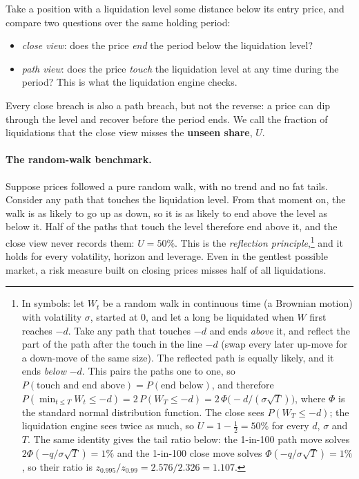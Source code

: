 Take a position with a liquidation level some distance below its entry price, and compare two
questions over the same holding period:
\begin{itemize}\itemsep0pt
\item \emph{close view}: does the price \emph{end} the period below the liquidation level?
\item \emph{path view}: does the price \emph{touch} the liquidation level at any time during the
period? This is what the liquidation engine checks.
\end{itemize}
Every close breach is also a path breach, but not the reverse: a price can dip through the level and
recover before the period ends. We call the fraction of liquidations that the close view misses the
\textbf{unseen share}, $U$.

\paragraph{The random-walk benchmark.} Suppose prices followed a pure random walk, with no trend and
no fat tails. Consider any path that touches the liquidation level. From that moment on, the walk is
as likely to go up as down, so it is as likely to end above the level as below it. Half of the paths
that touch the level therefore end above it, and the close view never records them: $U=50\%$. This is
the \emph{reflection principle},\footnote{In symbols: let $W_t$ be a random walk in continuous time
(a Brownian motion) with volatility $\sigma$, started at $0$, and let a long be liquidated when $W$
first reaches $-d$. Take any path that touches $-d$ and ends \emph{above} it, and reflect the part of
the path after the touch in the line $-d$ (swap every later up-move for a down-move of the same size).
The reflected path is equally likely, and it ends \emph{below} $-d$. This pairs the paths one to one,
so $P(\text{touch and end above}) = P(\text{end below})$, and therefore
$P(\min_{t\le T} W_t \le -d) = 2\,P(W_T \le -d) = 2\,\Phi\bigl(-d/(\sigma\sqrt{T})\bigr)$, where $\Phi$
is the standard normal distribution function. The close sees $P(W_T\le -d)$; the liquidation engine
sees twice as much, so $U = 1-\tfrac12 = 50\%$ for every $d$, $\sigma$ and $T$. The same identity gives
the tail ratio below: the 1-in-100 path move solves $2\Phi(-q/\sigma\sqrt{T}) = 1\%$ and the 1-in-100
close move solves $\Phi(-q/\sigma\sqrt{T}) = 1\%$, so their ratio is $z_{0.995}/z_{0.99} =
2.576/2.326 = 1.107$.} and it holds for every volatility, horizon and leverage. Even in the
gentlest possible market, a risk measure built on closing prices misses half of all liquidations.

